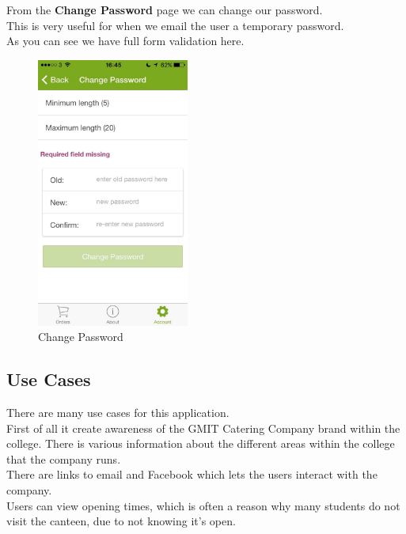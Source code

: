 \begin{minipage}{0.55\textwidth}
From the \textbf{Change Password} page we can change our password.
\\

This is very useful for when we email the user a temporary password.
\\

As you can see we have full form validation here.

\end{minipage}
\begin{minipage}{5cm}
	\begin{figure}[H]
		\includegraphics[width=5cm]{img/mobile-app/screen-shots/IMG_2918.jpg}
		\caption{Change Password}
	\end{figure}
\end{minipage} \hfill
    
\subsection{Use Cases}
There are many use cases for this application.
\\

First of all it create awareness of the GMIT Catering Company brand within the college.
There is various information about the different areas within the college that the company runs.
\\

There are links to email and Facebook which lets the users interact with the company.
\\

Users can view opening times, which is often a reason why many students do not visit the canteen, due to not knowing it's open.
\\

